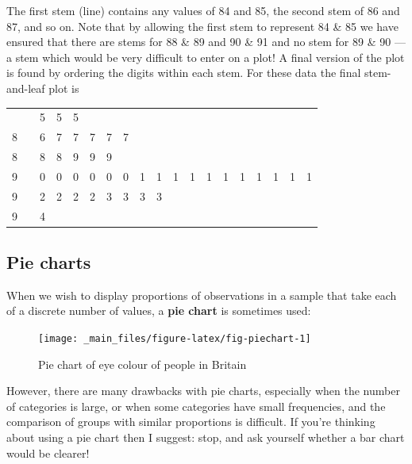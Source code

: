 \documentclass[
]{book}
\begin{document}
The first stem (line) contains any values of 84 and 85, the second stem
of 86 and 87, and so on. Note that by allowing the first stem to
represent 84 \& 85 we have ensured that there are stems for 88 \& 89 and
90 \& 91 and no stem for 89 \& 90 --- a stem which would be very difficult
to enter on a plot! A final version of the plot is found by ordering the
digits within each stem. For these data the final stem-and-leaf plot is

\newpage

\begin{longtable}[]{@{}lllllllllllllllllll@{}}
\toprule\noalign{}
\endhead
\bottomrule\noalign{}
\endlastfoot
8 & \textbar{} & 5 & 5 & 5 & & & & & & & & & & & & & & \\
8 & \textbar{} & 6 & 7 & 7 & 7 & 7 & 7 & & & & & & & & & & & \\
8 & \textbar{} & 8 & 8 & 9 & 9 & 9 & & & & & & & & & & & & \\
9 & \textbar{} & 0 & 0 & 0 & 0 & 0 & 0 & 1 & 1 & 1 & 1 & 1 & 1 & 1 & 1 & 1 & 1 & 1 \\
9 & \textbar{} & 2 & 2 & 2 & 2 & 3 & 3 & 3 & 3 & & & & & & & & & \\
9 & \textbar{} & 4 & & & & & & & & & & & & & & & & \\
\end{longtable}

\hypertarget{visual_plot_pie}{%
\subsection{\texorpdfstring{{\textbf{Pie charts}}}{Pie charts}}\label{visual_plot_pie}}

When we wish to display proportions of observations in a sample that take each of a discrete
number of values, a \textbf{pie chart} is sometimes used:

\begin{figure}

{\centering \texttt{[image: \_main\_files/figure-latex/fig-piechart-1]} 

}

\caption{Pie chart of eye colour of people in Britain}\label{fig:fig-piechart}
\end{figure}

However, there are many drawbacks with pie charts, especially when the
number of categories is large, or when some categories have small frequencies,
and the comparison of groups with similar proportions is difficult.
If you're thinking about using a pie chart then I suggest: stop, and ask yourself whether
a bar chart would be clearer!
\end{document}
